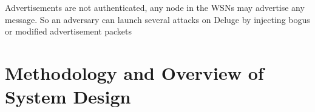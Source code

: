 \documentclass[conference,final]{IEEEtran}
\newcommand{\dme}[2]{\pdfmarkupcomment[markup=Highlight,color=yellow]{#1}{#2}}
\begin{document}
Advertisements are not authenticated, any node in the WSNs may advertise any message. So an adversary can 
launch several attacks on Deluge by injecting bogus or modified advertisement packets 




\section{Methodology and Overview of System Design}

%
\end{document}
